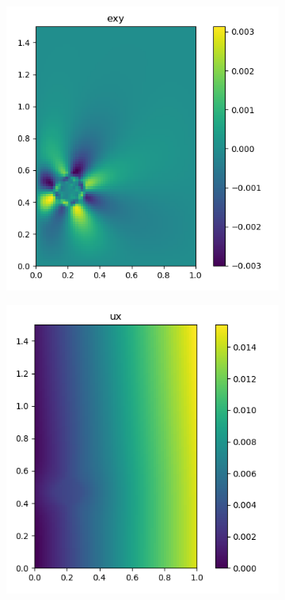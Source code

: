 \documentclass[12pt]{article}
\begin{document}
\begin{figure}[h]
\begin{subfigure}[c]{0.25\linewidth}
  \end{subfigure}
  \begin{subfigure}[c]{0.25\linewidth}
    \includegraphics[totalheight=4cm]{Figures/dispstrainfields/exy11_fypy.png}
  \end{subfigure}
  \begin{subfigure}[c]{0.25\linewidth}
    \includegraphics[totalheight=4cm]{Figures/dispstrainfields/ux11_fypy.png}

\end{subfigure}
\end{figure}
\end{document}
